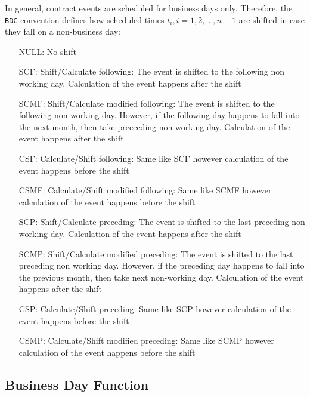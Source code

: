 \documentclass[9pt,oneside]{amsart}
\newcommand{\attr}[1]{\texttt{#1}}
\begin{document}
\begin{multicols}{2}
In general, contract events are scheduled for business days only. Therefore, the \attr{BDC} convention defines how scheduled times $t_i,i=1,2,...,n-1$ are shifted in case they fall on a non-business day:

\begin{itemize}
	\item[NULL:] No shift

	\item[SCF:] Shift/Calculate following: The event is shifted to the following non working day. Calculation of the event happens after the shift

	\item[SCMF:] Shift/Calculate modified following: The event is shifted to the following non working day. However, if the following day happens to fall into the next month, then take preceeding non-working day. Calculation of the event happens after the shift

	\item[CSF:] Calculate/Shift following: Same like SCF however calculation of the event happens before the shift

	\item[CSMF:] Calculate/Shift modified following: Same like SCMF however calculation of the event happens before the shift

	\item[SCP:] Shift/Calculate preceding: The event is shifted to the last preceding non working day. Calculation of the event happens after the shift

	\item[SCMP:] Shift/Calculate modified preceding: The event is shifted to the last preceding non working day. However, if the preceding day happens to fall into the previous month, then take next non-working day. Calculation of the event happens after the shift

	\item[CSP:] Calculate/Shift preceding: Same like SCP however calculation of the event happens before the shift

	\item[CSMP:] Calculate/Shift modified preceding: Same like SCMP however calculation of the event happens before the shift
\end{itemize}



\subsection{Business Day Function}


\end{multicols}
\end{document}
